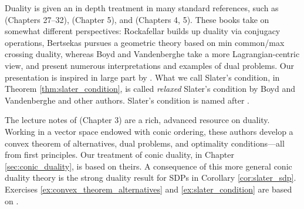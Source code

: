 Duality is given an in depth treatment in many standard references, such as
\cite{rockafellar1970convex} (Chapters 27--32), \cite{boyd2004convex} (Chapter  
5), and \cite{bertsekas2009convex} (Chapters 4, 5). These books take on
somewhat different perspectives: Rockafellar builds up duality via conjugacy
operations, Bertsekas pursues a geometric theory based on min common/max
crossing duality, whereas Boyd and Vandenberghe take a more Lagrangian-centric 
view, and present numerous interpretations and examples of dual problems. Our
presentation is inspired in large part by \cite{boyd2004convex}. What we call
Slater's condition, in Theorem \ref{thm:slater_condition}, is called
\emph{relaxed} Slater's condition by Boyd and Vandenberghe and other
authors. Slater's condition is named after \cite{slater1950lagrange}.  

The lecture notes of \cite{bental2023convex} (Chapter 3) are a rich, advanced
resource on duality. Working in a vector space endowed with conic ordering,
these authors develop a convex theorem of alternatives, dual problems, and
optimality conditions---all from first principles. Our treatment of conic 
duality, in Chapter \ref{sec:conic_duality}, is based on theirs. A consequence
of this more general conic duality theory is the strong duality result for SDPs
in Corollary \ref{cor:slater_sdp}. Exercises
\ref{ex:convex_theorem_alternatives} and \ref{ex:slater_condition} are based on
\cite{bental2023convex}.           
 
\clearpage


